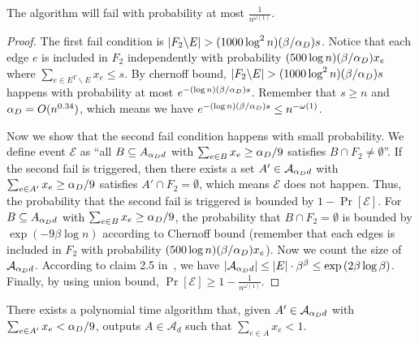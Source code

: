 \begin{claim}\label{lem:notfail}
	The algorithm will fail with probability at most $\frac{1}{n^{\omega(1)}}$.
\end{claim}
\begin{proof}
	The first fail condition is $|F_2\backslash E|>(1000\log^2 n)(\beta/\apxD{})s$. Notice that each edge $e$ is included in $F_2$ independently with probability $(500\log n)(\beta/\alpha_D{})x_e$ where $\sum_{e\in E^T\backslash E}x_e\le s$. By chernoff bound, $|F_2\backslash E|>(1000\log^2 n)(\beta/\apxD{}) s$ happens with probability at most $e^{-(\log n)(\beta/\alpha_D{}) s}$. Remember that $s\ge n$ and $\alpha_D{}=O(n^{0.34})$, which means we have $e^{-(\log n)(\beta/\alpha_D{}) s}\le n^{-\omega(1)}$.
	
	Now we show that the second fail condition happens with small probability. We define event $\mathcal{E}$ as ``all $B\subseteq A_{\alpha_D{} d}$ with $\sum_{e\in B}x_e\ge \alpha_D{}/9$ satisfies $B\cap F_2\not=\emptyset$''. If the second fail is triggered, then there exists a set $A'\in\mathcal{A}_{\alpha_D{} d}$ with $\sum_{e\in A'}x_e\ge \alpha_D{}/9$ satisfies $A'\cap F_2=\emptyset$, which means $\mathcal{E}$ does not happen. Thus, the probability that the second fail is triggered is bounded by $1-\Pr[\mathcal{E}]$. For $B\subseteq A_{\alpha_D{} d}$ with $\sum_{e\in B}x_e\ge \alpha_D{}/9$, the probability that $B\cap F_2=\emptyset$ is bounded by $\exp\left(-9\beta\log n\right)$ according to Chernoff bound (remember that each edges is included in $F_2$ with probability $(500\log n)(\beta/\alpha_D{})x_e$). Now we count the size of $\mathcal{A}_{\alpha_D{} d}$. According to claim 2.5 in~\cite{BermanBMRY13}, we have $|\mathcal{A}_{\alpha_D{} d}|\le |E|\cdot \beta^\beta\le \exp\left(2\beta\log\beta\right)$. Finally, by using union bound, $\Pr[\mathcal{E}]\ge 1-\frac{1}{n^{\omega(1)}}$.
\end{proof}
\begin{lemma}\label{lem:findantispanner}
	There exists a polynomial time algorithm that, given $A'\in\mathcal{A}_{\alpha_D{} d}$ with $\sum_{e\in A'}x_e< \alpha_D{}/9$, outputs $A\in\mathcal{A}_{d}$ such that $\sum_{e\in A}x_e< 1$. 
\end{lemma}
